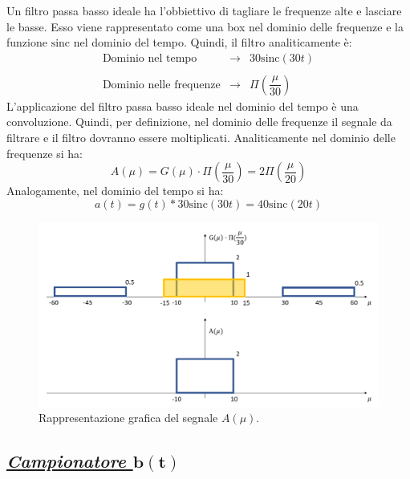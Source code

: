 \documentclass[a4paper]{article}
\begin{document}
	Un filtro passa basso ideale ha l'obbiettivo di tagliare le frequenze alte e lasciare le basse. Esso viene rappresentato come una box nel dominio delle frequenze e la funzione $\mathrm{sinc}$ nel dominio del tempo. Quindi, il filtro analiticamente è:
	\begin{equation*}
		\begin{array}{lll}
			\text{Dominio nel tempo} 		& \longrightarrow & 30\mathrm{sinc}\left(30t\right) \\
			\\
			\text{Dominio nelle frequenze} 	& \longrightarrow & \Pi\left(\dfrac{\mu}{30}\right)
		\end{array}
	\end{equation*}
	L'applicazione del filtro passa basso ideale nel dominio del tempo è una convoluzione. Quindi, per definizione, nel dominio delle frequenze il segnale da filtrare e il filtro dovranno essere moltiplicati. Analiticamente nel dominio delle frequenze si ha:
	\begin{equation*}
		A\left(\mu\right) = G\left(\mu\right) \cdot \Pi\left(\dfrac{\mu}{30}\right) = 2\Pi\left(\dfrac{\mu}{20}\right)
	\end{equation*}
	Analogamente, nel dominio del tempo si ha:
	\begin{equation*}
		a\left(t\right) = g\left(t\right) * 30\mathrm{sinc}\left(30t\right) = 40\mathrm{sinc}\left(20t\right)
	\end{equation*}
	\begin{figure}[!htp]
		\centering
		\includegraphics[width=\textwidth]{img/fig_2.png}
		\caption*{Rappresentazione grafica del segnale $A\left(\mu\right)$.}
	\end{figure}\newpage

	\subsection*{\textcolor{Green4}{\emph{\underline{Campionatore $\boldsymbol{b\left(t\right)}$}}}}
	
\end{document}
